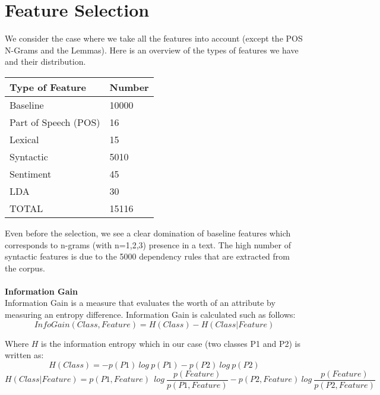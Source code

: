 \section{Feature Selection}
We consider the case where we take all the features into account (except the POS N-Grams and the Lemmas). Here is an overview of the types of features we have and their distribution. 
\\
\begin{table}[h]
\centering
\begin{tabular}{|l|l|}
\hline
Type of Feature      & Number \\ \hline
Baseline             & 10000  \\ \hline
Part of Speech (POS) & 16     \\ \hline
Lexical              & 15     \\ \hline
Syntactic            & 5010   \\ \hline
Sentiment            & 45     \\ \hline
LDA                  & 30     \\ \hline
\rowcolor[HTML]{C0C0C0} 
TOTAL                & 15116  \\ \hline
\end{tabular}
\end{table}

Even before the selection, we see a clear domination of baseline features which corresponds to n-grams (with n=1,2,3) presence in a text. The high number of syntactic features is due to the 5000 dependency rules that are extracted from the corpus. 
\\
\\
\textbf{Information Gain}
\\
Information Gain is a measure that evaluates the worth of an attribute by measuring an entropy difference. Information Gain is calculated such as follows:
\begin{equation*}
InfoGain(Class,Feature) = H(Class) - H(Class | Feature)
\end{equation*}

Where $H$ is the information entropy which in our case (two classes P1 and P2) is written as:
\begin{equation*}
H(Class) = -p(P1) \: log \: p(P1) - p(P2) \: log \: p(P2)
\end{equation*}
\begin{equation*}
H(Class | Feature) = p(P1, Feature) \: \: log \: \frac{p(Feature)}{p(P1, Feature)} - p(P2, Feature) \: log \: \frac{p(Feature)}{p(P2, Feature)}
\end{equation*}

